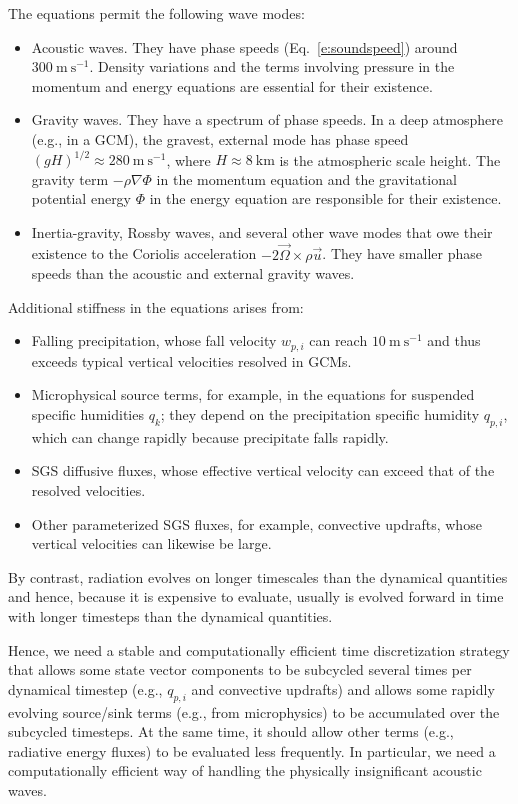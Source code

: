 \documentclass{report}
\begin{document}
The equations permit the following wave modes:
\begin{itemize}
    \item Acoustic waves. They have phase speeds (Eq.~\eqref{e:soundspeed}) around $300~\mathrm{m~s^{-1}}$. Density variations and the terms involving pressure in the momentum and energy equations are essential for their existence.
    \item Gravity waves. They have a spectrum of phase speeds. In a deep atmosphere (e.g., in a GCM), the gravest, external mode has phase speed $(gH)^{1/2} \approx 280~\mathrm{m~s^{-1}}$, where $H\approx 8~\mathrm{km}$ is the atmospheric scale height. The gravity term $-\rho \nabla \Phi$ in the momentum equation and the gravitational potential energy $\Phi$ in the energy equation are responsible for their existence.
    \item Inertia-gravity, Rossby waves, and several other wave modes that owe their existence to the Coriolis acceleration $-2\vec{\Omega} \times \rho \vec{u}$. They have smaller phase speeds than the acoustic and external gravity waves.
\end{itemize}
Additional stiffness in the equations arises from:
\begin{itemize}
    \item Falling precipitation, whose fall velocity $w_{p,i}$ can reach $10~\mathrm{m~s^{-1}}$ and thus exceeds typical vertical velocities resolved in GCMs.
    \item Microphysical source terms, for example, in the equations for suspended specific humidities $q_k$; they depend on the precipitation specific humidity $q_{p,i}$, which can change rapidly because precipitate falls rapidly. 
    \item SGS diffusive fluxes, whose effective vertical velocity can exceed that of the resolved velocities.
    \item Other parameterized SGS fluxes, for example, convective updrafts, whose vertical velocities can likewise be large.
\end{itemize}
By contrast, radiation evolves on longer timescales than the dynamical quantities and hence, because it is expensive to evaluate, usually is evolved forward in time with longer timesteps than the dynamical quantities. 

Hence, we need a stable and computationally efficient time discretization strategy that allows some state vector components to be subcycled several times per dynamical timestep (e.g., $q_{p,i}$ and convective updrafts) and allows some rapidly evolving source/sink terms (e.g., from microphysics) to be accumulated over the subcycled timesteps. At the same time, it should allow other terms (e.g., radiative energy fluxes) to be evaluated less frequently. In particular, we need a computationally efficient way of handling the physically insignificant acoustic waves.
\end{document}
